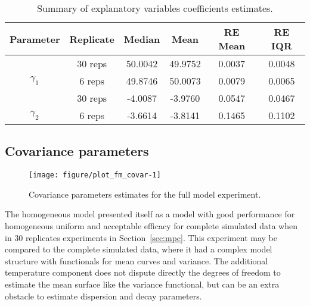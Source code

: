 \begin{table}[b]\centering
\caption{Summary of explanatory variables coefficients estimates.}
\begin{knitrout}
\color{fgcolor}
\begin{tabular}{cccccc}
\toprule
Parameter & Replicate & Median & Mean & RE Mean & RE IQR\\
\midrule
 & 30 reps & 50.0042 & 49.9752 & 0.0037 & 0.0048\\
\cmidrule{2-6}
\multirow{-2}{*}{\centering\arraybackslash $\gamma_1$} & 6 reps & 49.8746 & 50.0073 & 0.0079 & 0.0065\\
\cmidrule{1-6}
 & 30 reps & -4.0087 & -3.9760 & 0.0547 & 0.0467\\
\cmidrule{2-6}
\multirow{-2}{*}{\centering\arraybackslash $\gamma_2$} & 6 reps & -3.6614 & -3.8141 & 0.1465 & 0.1102\\
\bottomrule
\end{tabular}


\end{knitrout}
\label{tab:fm-expl-tab}
\end{table}

\subsection{Covariance parameters}
\label{sec:fm-covar}





\begin{figure}[t]
  \centering
\begin{knitrout}
\color{fgcolor}
\texttt{[image: figure/plot\_fm\_covar-1]} 

\end{knitrout}
  \caption{Covariance parameters estimates for the full model experiment.}
  \label{fig:fm-covar}
\end{figure}

The homogeneous model presented itself as a model with good performance for homogeneous uniform and acceptable efficacy for complete simulated data when in 30 replicates experiments in Section~\ref{sec:mpc}. This experiment may be compared to the complete simulated data, where it had a complex model structure with functionals for mean curves and variance. The additional temperature component does not dispute directly the degrees of freedom to estimate the mean surface like the variance functional, but can be an extra obstacle to estimate dispersion and decay parameters.

